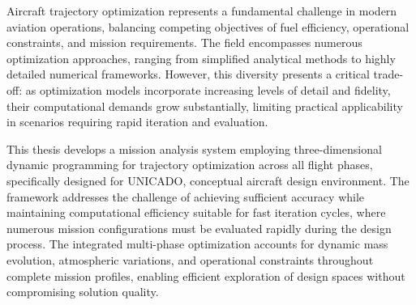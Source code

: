 
Aircraft trajectory optimization represents a fundamental challenge in modern aviation operations, balancing competing objectives of fuel efficiency, operational constraints, and mission requirements. The field encompasses numerous optimization approaches, ranging from simplified analytical methods to highly detailed numerical frameworks. However, this diversity presents a critical trade-off: as optimization models incorporate increasing levels of detail and fidelity, their computational demands grow substantially, limiting practical applicability in scenarios requiring rapid iteration and evaluation.

This thesis develops a mission analysis system employing three-dimensional dynamic programming for trajectory optimization across all flight phases, specifically designed for UNICADO, conceptual aircraft design environment. The framework addresses the challenge of achieving sufficient accuracy while maintaining computational efficiency suitable for fast iteration cycles, where numerous mission configurations must be evaluated rapidly during the design process. The integrated multi-phase optimization accounts for dynamic mass evolution, atmospheric variations, and operational constraints throughout complete mission profiles, enabling efficient exploration of design spaces without compromising solution quality.

 
